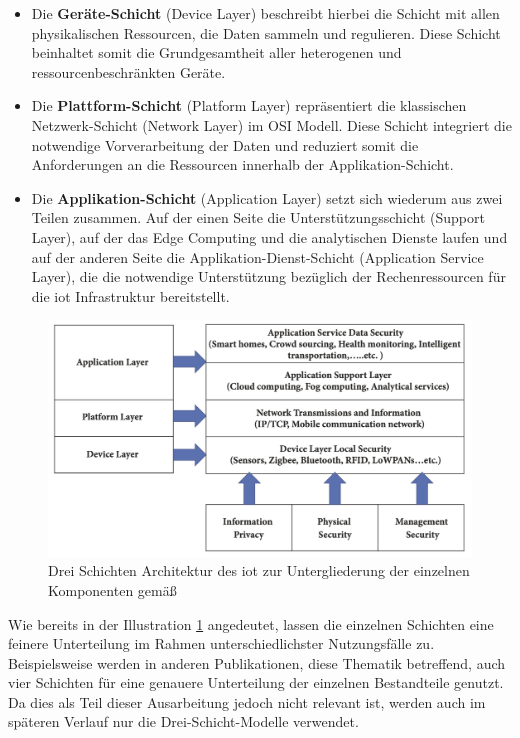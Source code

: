 \begin{itemize}
\item Die \textbf{Geräte-Schicht} (Device Layer) beschreibt hierbei die Schicht mit allen physikalischen Ressourcen, die Daten sammeln und regulieren. Diese Schicht beinhaltet somit die Grundgesamtheit aller heterogenen und ressourcenbeschränkten Geräte.
\item Die \textbf{Plattform-Schicht} (Platform Layer) repräsentiert die klassischen Netzwerk-Schicht (Network Layer) im OSI Modell. Diese Schicht integriert die notwendige Vorverarbeitung der Daten und reduziert somit die Anforderungen an die Ressourcen innerhalb der Applikation-Schicht.
\item Die \textbf{Applikation-Schicht} (Application Layer) setzt sich wiederum aus zwei Teilen zusammen. Auf der einen Seite die Unterstützungsschicht (Support Layer), auf der das Edge Computing und die analytischen Dienste laufen und auf der anderen Seite die Applikation-Dienst-Schicht (Application Service Layer), die die notwendige Unterstützung bezüglich der Rechenressourcen für die \ac{iot} Infrastruktur bereitstellt.
\end{itemize}

\begin{figure}
\includegraphics[width=\textwidth]{fundamentals/pictures/IoT_Layer_Architecture}
\caption{Drei Schichten Architektur des \ac{iot} zur Untergliederung der einzelnen Komponenten gemäß \cite{Seliem2018}}
\label{fig:drei-schichten-iot}
\end{figure}

Wie bereits in der Illustration \ref{fig:drei-schichten-iot} angedeutet, lassen die einzelnen Schichten eine feinere Unterteilung im Rahmen unterschiedlichster Nutzungsfälle zu. Beispielsweise werden in anderen Publikationen, diese Thematik betreffend, auch vier Schichten für eine genauere Unterteilung der einzelnen Bestandteile genutzt. Da dies als Teil dieser Ausarbeitung jedoch nicht relevant ist, werden auch im späteren Verlauf nur die Drei-Schicht-Modelle verwendet.


